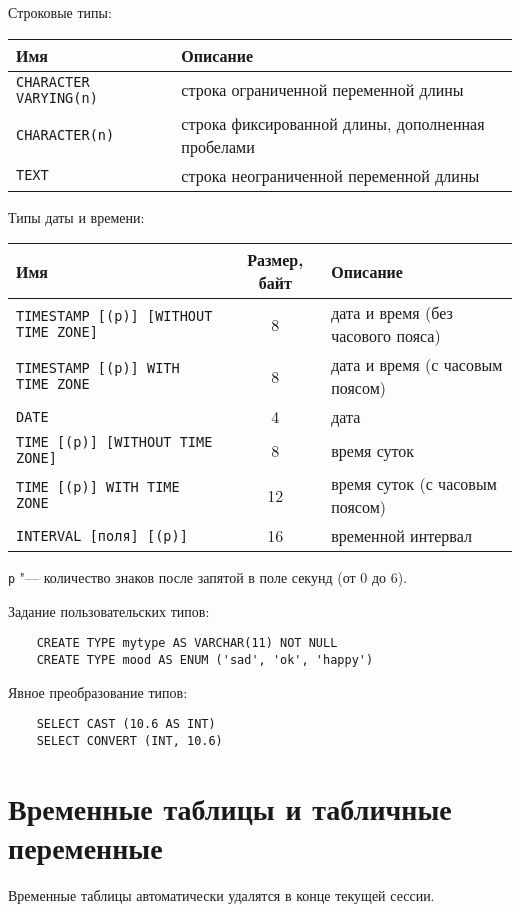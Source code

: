 \vspace{1em}

Строковые типы: \\
\begin{tabular}{l | l}
	\textbf{Имя} & \textbf{Описание} \\
	\hline
	\texttt{CHARACTER VARYING(n)} & строка ограниченной переменной длины \\
	\texttt{CHARACTER(n)} & строка фиксированной длины, дополненная пробелами \\
	\texttt{TEXT} & строка неограниченной переменной длины
\end{tabular}

\vspace{1em}

Типы даты и времени: \\
\begin{tabular}{l | c | l}
	\textbf{Имя} & \textbf{Размер, байт} & \textbf{Описание} \\
	\hline
	\texttt{TIMESTAMP [(p)] [WITHOUT TIME ZONE]} & 8 & дата и время (без часового пояса) \\
	\texttt{TIMESTAMP [(p)] WITH TIME ZONE} & 8 & дата и время (с часовым поясом) \\
	\texttt{DATE} & 4 & дата \\
	\texttt{TIME [(p)] [WITHOUT TIME ZONE]} & 8 & время суток \\
	\texttt{TIME [(p)] WITH TIME ZONE} & 12 & время суток (с часовым поясом) \\
	\texttt{INTERVAL [поля] [(p)]} & 16 & временной интервал
\end{tabular}

\texttt{p} "--- количество знаков после запятой в поле секунд (от 0 до 6).

Задание пользовательских типов:
\begin{verbatim}
	CREATE TYPE mytype AS VARCHAR(11) NOT NULL
	CREATE TYPE mood AS ENUM ('sad', 'ok', 'happy')
\end{verbatim}

Явное преобразование типов:
\begin{verbatim}
	SELECT CAST (10.6 AS INT)
	SELECT CONVERT (INT, 10.6)
\end{verbatim}

\section{Временные таблицы и табличные переменные}

Временные таблицы автоматически удалятся в конце текущей сессии.

